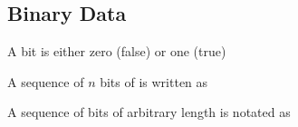 \subsection{Binary Data}

A bit is either zero (false) or one (true)


A sequence of $n$ bits of is written as


A sequence of bits of arbitrary length is notated as

